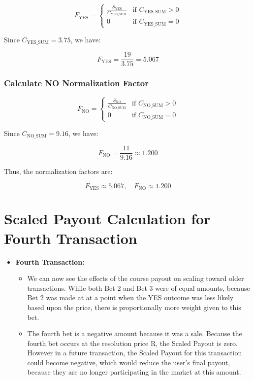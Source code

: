 \documentclass{article}
\begin{document}
\[
F_{\text{YES}} =
\begin{cases}
      \frac{S_{\text{YES}}}{C_{\text{YES\_SUM}}} & \text{if } C_{\text{YES\_SUM}} > 0 \\
      0 & \text{if } C_{\text{YES\_SUM}} = 0
   \end{cases}
\]

Since \( C_{\text{YES\_SUM}} = 3.75 \), we have:

\[
F_{\text{YES}} = \frac{19}{3.75} = 5.067
\]

\subsubsection*{Calculate NO Normalization Factor}

\[
F_{\text{NO}} =
\begin{cases}
      \frac{S_{\text{NO}}}{C_{\text{NO\_SUM}}} & \text{if } C_{\text{NO\_SUM}} > 0 \\
      0 & \text{if } C_{\text{NO\_SUM}} = 0
   \end{cases}
\]

Since \( C_{\text{NO\_SUM}} = 9.16 \), we have:

\[
F_{\text{NO}} = \frac{11}{9.16} \approx 1.200
\]

Thus, the normalization factors are:

\[
F_{\text{YES}} \approx 5.067, \quad F_{\text{NO}} \approx 1.200
\]


\section*{Scaled Payout Calculation for Fourth Transaction}

\begin{itemize}
    \item \textbf{Fourth Transaction:}
    \begin{itemize}
        \item We can now see the effects of the course payout on scaling toward older transactions. While both Bet 2 and Bet 3 were of equal amounts, because Bet 2 was made at at a point when the YES outcome was less likely based upon the price, there is proportionally more weight given to this bet.
        \item The fourth bet is a negative amount because it was a sale. Because the fourth bet occurs at the resolution price R, the Scaled Payout is zero. However in a future transaction, the Scaled Payout for this transaction could become negative, which would reduce the user's final payout, because they are no longer participating in the market at this amount.
    \end{itemize}
\end{itemize}
\end{document}
